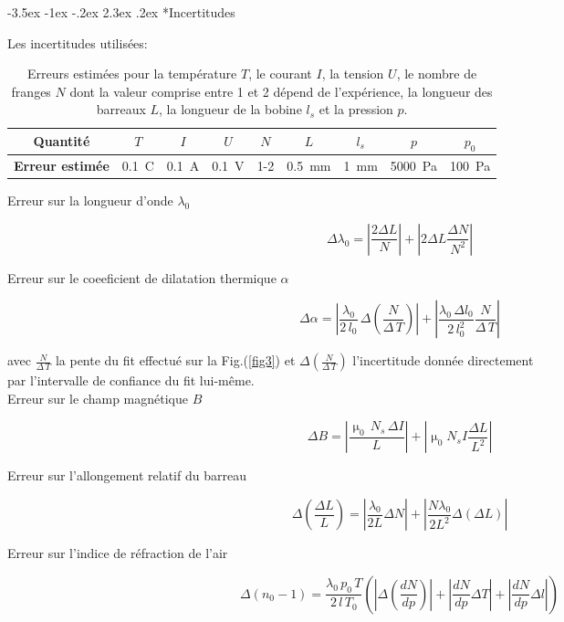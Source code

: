 \documentclass[a4paper, 12pt,oneside]{article}
\makeatletter
\renewcommand{\subsection}{\@startsection {subsection}{1}{\z@}%
             {-3.5ex \@plus -1ex \@minus -.2ex}%
             {2.3ex \@plus.2ex}%
             {\normalfont\normalsize\bfseries}}
\makeatother
\begin{document}
\subsection*{Incertitudes}

Les incertitudes utilisées:
\begin{table}[h!]
    \centering
    \renewcommand{\arraystretch}{1.5}
    \begin{tabular}{|c|c|c|c|c|c|c|c|c|}
        \hline
        \textbf{Quantité} & $T$ & $I$ & $U$ & $N$ & $L$ & $l_s$ & $p$ &$p_0$ \\ \hline
        \textbf{Erreur estimée} & 0.1~\textdegree{}C & 0.1~A & 0.1~V &1-2 & 0.5~mm & 1~mm & 5000~Pa & 100~Pa\\ \hline
    \end{tabular}
    \caption{Erreurs estimées pour la température $T$, le courant $I$, la tension $U$, le nombre de franges $N$ dont la valeur comprise entre 1 et 2 dépend de l'expérience, la longueur des barreaux $L$, la longueur de la bobine $l_s$ et la pression $p$.}
\end{table}

Erreur sur la longueur d'onde $\lambda_0$

\[
\Delta \lambda_0 = \left| \frac{2 \Delta L}{N} \right| + \left| 2 \Delta L \frac{\Delta N}{N^2} \right|
\]

Erreur sur le coeeficient de dilatation thermique $\alpha$

\[
\Delta \alpha = \left| \frac{\lambda_0}{2\,l_0} \,\Delta\left(\frac{N}{\Delta\,T}\right)\right| + \left|\frac{\lambda_0\,\Delta l_0}{2\,l_0^2}\frac{N}{\Delta\,T}\right|
\]

avec $\frac{N}{\Delta\,T}$ la pente du fit effectué sur la Fig.(\ref{fig3}) et $\Delta\left(\frac{N}{\Delta\,T}\right)$ l'incertitude donnée directement\\
\indent par l'intervalle de confiance du fit lui-même.\\

Erreur sur le champ magnétique $B$

\[
\Delta B = \left| \frac{\upmu_0\, N_s\, \Delta I}{L} \right| + \left| \upmu_0 N_s I \frac{\Delta L}{L^2} \right|
\]

Erreur sur l'allongement relatif du barreau

\[
\Delta \left( \frac{\Delta L}{L} \right) = \left| \frac{\lambda_0}{2L} \Delta N \right| + \left| \frac{N \lambda_0}{2L^2} \Delta (\Delta L) \right|
\]

Erreur sur l'indice de réfraction de l'air

\[
\Delta (n_0 - 1) = \frac{\lambda_0 \,p_0\, T}{2\,l\,T_0} \left( \left| \Delta \left( \frac{dN}{dp} \right) \right| + \left| \frac{dN}{dp} \Delta T \right| + \left| \frac{dN}{dp} \Delta l \right| \right)
\]
\end{document}

